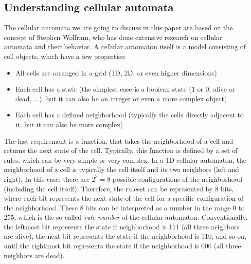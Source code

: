 \documentclass[a4paper,12pt]{llncs}
\numberwithin{equation}{section}
\begin{document}
\subsection{Understanding cellular automata}
\label{sec:cellular-automata-understanding}
The cellular automata we are going to discuss in this paper are based on the concept of Stephen Wolfram, who has done extensive research on cellular automata and their behavior.
A cellular automaton itself is a model consisting of cell objects, which have a few properties:
\begin{itemize}
  \item All cells are arranged in a grid (1D, 2D, or even higher dimensions)
  \item Each cell has a state (the simplest case is a boolean state (1 or 0, alive or dead, ...), but it can also be an integer or even a more complex object)
  \item Each cell has a defined neighborhood (typically the cells directly adjacent to it, but it can also be more complex)
\end{itemize}
The last requirement is a function, that takes the neighborhood of a cell and returns the next state of the cell.
Typically, this function is defined by a set of rules, which can be very simple or very complex.
In a 1D cellular automaton, the neighborhood of a cell is typically the cell itself and its two neighbors (left and right).
In this case, there are $2^3=8$ possible configurations of the neighborhood (including the cell itself).
Therefore, the ruleset can be represented by 8 bits, where each bit represents the next state of the cell for a specific configuration of the neighborhood.
These 8 bits can be interpreted as a number in the range $0$ to $255$, which is the so-called \textit{rule number} of the cellular automaton.
Conventionally, the leftmost bit represents the state if neighborhood is 111 (all three neighbors are alive), the next bit represents the state if the neighborhood is 110, and so on, until the rightmost bit represents the state if the neighborhood is 000 (all three neighbors are dead).
\end{document}
